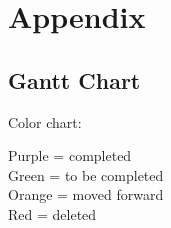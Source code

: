 \documentclass[11pt]{article}
\begin{document}






\newpage

\section{Appendix}


\subsection{Gantt Chart}

Color chart:

Purple = completed \\
Green  = to be completed\\
Orange = moved forward\\
Red = deleted\\
\end{document}
